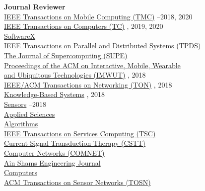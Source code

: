 {\bf Journal Reviewer}\\
{\href{https://www.computer.org/portal/web/tmc}{IEEE Transactions on Mobile Computing (TMC)}} --2018, 2020\\
{\href{https://www.computer.org/web/tc}{IEEE Transactions on Computers (TC)}} , 2019, 2020\\
{\href{https://www.journals.elsevier.com/softwarex}{SoftwareX}} \\
{\href{https://www.computer.org/csdl/journal/td}{IEEE Transactions on Parallel and Distributed Systems (TPDS)}} \\
{\href{https://www.springer.com/computer/swe/journal/11227}{The Journal of Supercomputing (SUPE)}} \\
{\href{https://imwut.acm.org}{Proceedings of the ACM on Interactive, Mobile, Wearable \\\mbox{\hspace{0.6cm}} and Ubiquitous Technologies (IMWUT)}} , 2018\\
{\href{http://ieeexplore.ieee.org/xpl/RecentIssue.jsp?punumber=90}{IEEE/ACM Transactions on Networking (TON)}} , 2018\\
{\href{https://www.journals.elsevier.com/knowledge-based-systems}{Knowledge-Based Systems}} , 2018\\
{\href{http://www.mdpi.com/journal/sensors}{Sensors}} --2018\\
{\href{http://www.mdpi.com/journal/applsci}{Applied Sciences}} \\
{\href{http://www.mdpi.com/journal/algorithms}{Algorithms}} \\
{\href{https://www.computer.org/web/tsc}{IEEE Transactions on Services Computing (TSC)}} \\
{\href{http://benthamscience.com/journals/current-signal-transduction-therapy/}{Current Signal Transduction Therapy (CSTT)}} \\
{\href{http://ees.elsevier.com/comnet/}{Computer Networks (COMNET)}} \\
{\href{https://www.journals.elsevier.com/ain-shams-engineering-journal}{Ain Shams Engineering Journal}} \\
{\href{http://www.mdpi.com/journal/computers}{Computers}} \\
{\href{http://tosn.acm.org/}{ACM Transactions on Sensor Networks (TOSN)}} \\
